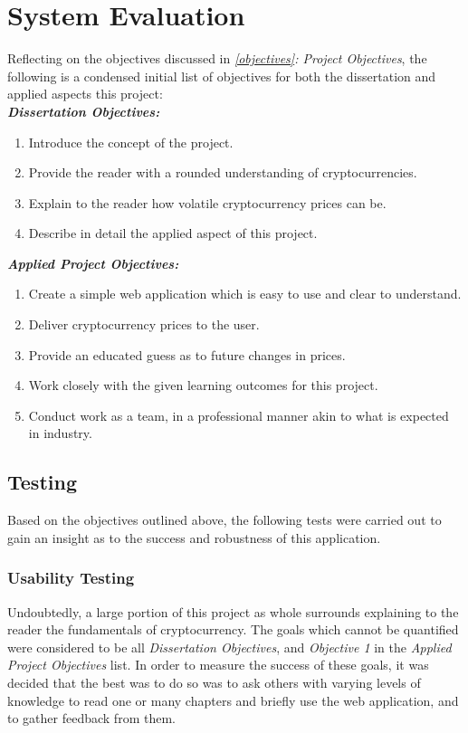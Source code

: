 \section{System Evaluation}\label{seceval}
Reflecting on the objectives discussed in \textit{\ref{objectives}: Project Objectives}, the following is a condensed initial list of objectives for both the dissertation and applied aspects this project:\\

\textit{\textbf{Dissertation Objectives:}}
\begin{enumerate}
    \item Introduce the concept of the project.
    \item Provide the reader with a rounded understanding of cryptocurrencies.
    \item Explain to the reader how volatile cryptocurrency prices can be.
    \item Describe in detail the applied aspect of this project.
\end{enumerate}

\textit{\textbf{Applied Project Objectives:}}
\begin{enumerate}
    \item Create a simple web application which is easy to use and clear to understand.
    \item Deliver cryptocurrency prices to the user.
    \item Provide an educated guess as to future changes in prices.
    \item Work closely with the given learning outcomes for this project.
    \item Conduct work as a team, in a professional manner akin to what is expected in industry.
\end{enumerate}

\subsection{Testing}
Based on the objectives outlined above, the following tests were carried out to gain an insight as to the success and robustness of this application.

\subsubsection{Usability Testing}
Undoubtedly, a large portion of this project as whole surrounds explaining to the reader the fundamentals of cryptocurrency. The goals which cannot be quantified were considered to be all \textit{Dissertation Objectives}, and \textit{Objective 1} in the \textit{Applied Project Objectives} list. In order to measure the success of these goals, it was decided that the best was to do so was to ask others with varying levels of knowledge to read one or many chapters and briefly use the web application, and to gather feedback from them.

